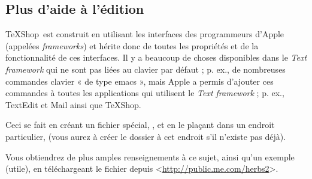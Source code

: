 \documentclass[11pt,french]{article}
\newcommand{\TS}{\textsf{\TeX Shop}}
\newcommand{\cmd}[1]{\textsf{#1}}
\begin{document}
\subsection{Plus d'aide à l'édition}

\TS\ est construit en utilisant les interfaces des programmeurs d'Apple (appelées \emph{frameworks}) et hérite donc de toutes les propriétés et de la fonctionnalité de ces interfaces. Il y a beaucoup de choses disponibles dans le \emph{Text framework} qui ne sont pas liées au clavier par défaut ; p. ex., de nombreuses commandes clavier « de type \cmd{emacs} », mais Apple a permis d'ajouter ces commandes à toutes les applications qui utilisent le \emph{Text framework} ; p. ex., \textsf{TextEdit} et \textsf{Mail} ainsi que \TS.

Ceci se fait en créant un fichier spécial, , et en le plaçant dans un endroit particulier,  (vous aurez à créer le dossier  à cet endroit s'il n'existe pas déjà).

Vous obtiendrez de plus amples renseignements à ce sujet, ainsi qu'un exemple (utile), en téléchargeant le fichier  depuis <\url{http://public.me.com/herbs2}>.

%
%

\end{document}
